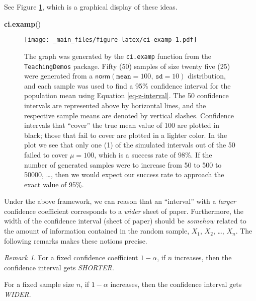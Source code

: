 \documentclass[]{book}
\newenvironment{Shaded}{\begin{snugshade}}{\end{snugshade}}
\newcommand{\KeywordTok}[1]{\textcolor[rgb]{0.13,0.29,0.53}{\textbf{{#1}}}}
\newcommand{\NormalTok}[1]{{#1}}
\numberwithin{equation}{chapter}
\numberwithin{figure}{chapter}
\theoremstyle{plain}
\theoremstyle{definition}
\theoremstyle{remark}
\theoremstyle{definition}
\theoremstyle{definition}
\theoremstyle{remark}
\newtheorem*{remark}{Remark}
\begin{document}
See Figure \ref{fig:ci-examp}, which is a graphical display of these
ideas.

\begin{Shaded}
\begin{Highlighting}[]
\KeywordTok{ci.examp}\NormalTok{()}
\end{Highlighting}
\end{Shaded}

\begin{figure}[htbp]
\centering
\texttt{[image: \_main\_files/figure-latex/ci-examp-1.pdf]}
\caption{\label{fig:ci-examp}\small The graph was generated by the
\texttt{ci.examp} function from the \texttt{TeachingDemos} package.
Fifty (50) samples of size twenty five (25) were generated from a
\(\mathsf{norm}(\mathtt{mean}=100,\,\mathtt{sd}=10)\) distribution, and
each sample was used to find a 95\% confidence interval for the
population mean using Equation \eqref{eq-z-interval}. The 50 confidence
intervals are represented above by horizontal lines, and the respective
sample means are denoted by vertical slashes. Confidence intervals that
``cover'' the true mean value of 100 are plotted in black; those that
fail to cover are plotted in a lighter color. In the plot we see that
only one (1) of the simulated intervals out of the 50 failed to cover
\(\mu=100\), which is a success rate of 98\%. If the number of generated
samples were to increase from 50 to 500 to 50000, \ldots{}, then we
would expect our success rate to approach the exact value of 95\%.}
\end{figure}
















Under the above framework, we can reason that an ``interval'' with a
\emph{larger} confidence coefficient corresponds to a \emph{wider} sheet
of paper. Furthermore, the width of the confidence interval (sheet of
paper) should be \emph{somehow} related to the amount of information
contained in the random sample, \(X_{1}\), \(X_{2}\), \ldots{},
\(X_{n}\). The following remarks makes these notions precise.

\bigskip

\begin{remark}
For a fixed confidence coefficient \(1-\alpha\), if \(n\) increases,
then the confidence interval gets \emph{SHORTER}.

For a fixed sample size \(n\), if \(1-\alpha\) increases, then the
confidence interval gets \emph{WIDER}.
\end{remark}
\end{document}
